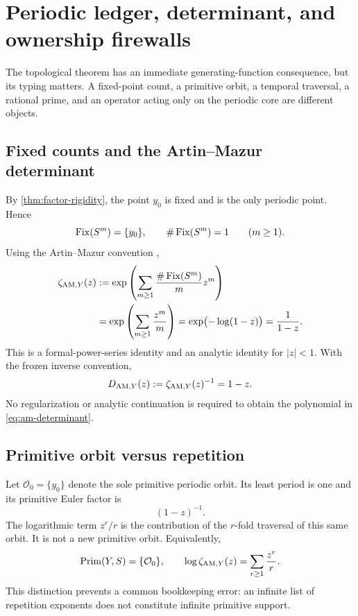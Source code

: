 \section{Periodic ledger, determinant, and ownership firewalls}
\label{sec:periodic-ledger}

The topological theorem has an immediate generating-function consequence,
but its typing matters.  A fixed-point count, a primitive orbit, a temporal
traversal, a rational prime, and an operator acting only on the periodic core
are different objects.

\subsection{Fixed counts and the Artin--Mazur determinant}

By \cref{thm:factor-rigidity}, the point \(y_0\) is fixed and is the only
periodic point.  Hence
\begin{equation}
  \operatorname{Fix}(S^m)=\{y_0\},
  \qquad \#\operatorname{Fix}(S^m)=1
  \qquad(m\geq1).
  \label{eq:fixed-counts}
\end{equation}
Using the Artin--Mazur convention \citep{artin1965periodic},
\begin{align}
  \zeta_{\mathrm{AM},Y}(z)
  &:=\exp\left(
    \sum_{m\geq1}\frac{\#\operatorname{Fix}(S^m)}{m}z^m
  \right) \notag\\
  &=\exp\left(\sum_{m\geq1}\frac{z^m}{m}\right)
   =\exp\bigl(-\log(1-z)\bigr)
   =\frac{1}{1-z}.
  \label{eq:am-zeta}
\end{align}
This is a formal-power-series identity and an analytic identity for
\(|z|<1\).  With the frozen inverse convention,
\begin{equation}
  D_{\mathrm{AM},Y}(z):=\zeta_{\mathrm{AM},Y}(z)^{-1}=1-z.
  \label{eq:am-determinant}
\end{equation}
No regularization or analytic continuation is required to obtain the
polynomial in \cref{eq:am-determinant}.

\subsection{Primitive orbit versus repetition}

Let \(\mathcal O_0=\{y_0\}\) denote the sole primitive periodic orbit.  Its
least period is one and its primitive Euler factor is
\[
  (1-z)^{-1}.
\]
The logarithmic term \(z^r/r\) is the contribution of the \(r\)-fold
traversal of this same orbit.  It is not a new primitive orbit.  Equivalently,
\[
  \operatorname{Prim}(Y,S)=\{\mathcal O_0\},
  \qquad
  \log\zeta_{\mathrm{AM},Y}(z)=\sum_{r\geq1}\frac{z^r}{r}.
\]
This distinction prevents a common bookkeeping error: an infinite list of
repetition exponents does not constitute infinite primitive support.

